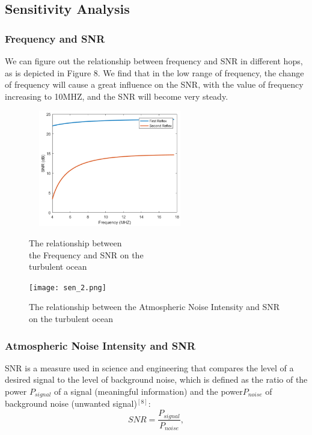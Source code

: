\documentclass{mcmthesis}
\begin{document}
   \subsection{Sensitivity Analysis}
   \subsubsection{ Frequency and SNR}
   We can figure out the relationship between frequency and SNR in different hops, as is depicted in Figure 8.
    We find that in the low range of frequency, the change of frequency will cause a great influence on the SNR, with the value of frequency increasing to 10MHZ, and the SNR will become very steady.
   \begin{figure}
\begin{minipage}[t]{0.5\linewidth}
\centering
\includegraphics[width=2.8in,height=2in]{figure/sen_1.png}
   \caption{The relationship between\protect\\ the Frequency and SNR on the \protect\\turbulent ocean}
     \label{fig:side:a}
\end{minipage}%
\begin{minipage}[t]{0.5\linewidth}
\centering
\texttt{[image: sen\_2.png]}
   \caption{The relationship between the Atmospheric Noise Intensity and SNR on the turbulent ocean}
     \label{fig:side:b}
\end{minipage}
\end{figure}  
   \subsubsection{Atmospheric Noise Intensity and SNR}
SNR is a measure used in science and engineering that compares the level of a desired signal to the level of background noise, which is defined as the ratio of the power $P_{signal}$ of a signal (meaningful information) and the power$P_{noise}$ of background noise (unwanted signal)$^{[8]}$:
\begin{equation*}
SNR = \frac{P_{signal}}{P_{noise}},
\end{equation*}   
\end{document}
